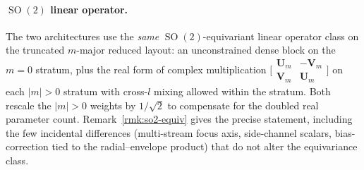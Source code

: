 \documentclass[11pt,a4paper]{article}
\DeclareMathOperator{\SO}{SO}
\newcommand{\bU}{\bm{U}}
\newcommand{\bV}{\bm{V}}
\theoremstyle{plain}
\theoremstyle{definition}
\theoremstyle{remark}
\begin{document}
\paragraph{$\SO(2)$ linear operator.}
The two architectures use the \emph{same} $\SO(2)$-equivariant linear operator
class on the truncated $m$-major reduced layout: an unconstrained dense block
on the $m=0$ stratum, plus the real form of complex multiplication $\bigl[\begin{smallmatrix}\bU_m&-\bV_m\\\bV_m&\bU_m\end{smallmatrix}\bigr]$ on each $|m|>0$ stratum with cross-$l$ mixing allowed within the stratum.
Both rescale the $|m|>0$ weights by $1/\sqrt{2}$ to compensate for the doubled real parameter count.
Remark~\ref{rmk:so2-equiv} gives the precise statement, including the few incidental differences (multi-stream focus axis, side-channel scalars, bias-correction tied to the radial--envelope product) that do not alter the equivariance class.
\end{document}
